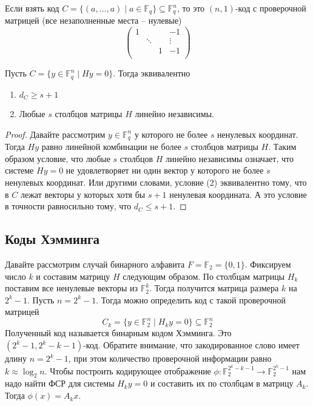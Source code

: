 Если взять код $C = \{(a, \ldots, a) \mid a\in \mathbb F_q\}\subseteq \mathbb F_q^n$, то это $(n, 1)$-код с проверочной матрицей (все незаполненные места -- нулевые)
\[
\begin{pmatrix}
{1}&{}&{}&{-1}\\
{}&{\ddots}&{}&{\vdots}\\
{}&{}&{1}&{-1}\\
\end{pmatrix}
\]

\begin{claim}
Пусть $C = \{y\in \mathbb F_q^n\mid Hy = 0\}$.
Тогда эквивалентно
\begin{enumerate}
\item $d_C \geqslant s + 1$

\item Любые $s$ столбцов матрицы $H$ линейно независимы.
\end{enumerate}
\end{claim}
\begin{proof}
Давайте рассмотрим $y\in \mathbb F_q^n$ у которого не более $s$ ненулевых координат.
Тогда $Hy$ равно линейной комбинации не более $s$ столбцов матрицы $H$.
Таким образом условие, что любые $s$ столбцов $H$ линейно независимы означает, что системе $Hy = 0$ не удовлетворяет ни один вектор у которого не более $s$ ненулевых координат.
Или другими словами, условие (2) эквивалентно тому, что в $C$ лежат векторы у которых хотя бы $s+1$ ненулевая координата.
А это условие в точности равносильно тому, что $d_C \leqslant s+1$.
\end{proof}

\subsection{Коды Хэмминга}

Давайте рассмотрим случай бинарного алфавита $F = \mathbb F_2 = \{0, 1\}$.
Фиксируем число $k$ и составим матрицу $H$ следующим образом.
По столбцам матрицы $H_k$ поставим все ненулевые векторы из $\mathbb F_2^k$.
Тогда получится матрица размера $k$ на $2^k - 1$.
Пусть $n = 2^k - 1$.
Тогда можно определить код с такой проверочной матрицей
\[
C_k = \{y\in \mathbb F_2^n \mid H_ky = 0\}\subseteq \mathbb F_2^n
\]
Полученный код называется бинарным кодом Хэмминга.
Это $(2^k -1, 2^k - k - 1)$-код.
Обратите внимание, что закодированное слово имеет длину $n = 2^k - 1$, при этом количество проверочной информации равно $k \approx \log_2 n$.
Чтобы построить кодирующее отображение $\phi\colon \mathbb F_2^{2^k - k - 1}\to \mathbb F_2^{2^k - 1}$ нам надо найти ФСР для системы $H_k y = 0$ и составить их по столбцам в матрицу $A_k$.
Тогда $\phi(x) = A_kx$.

